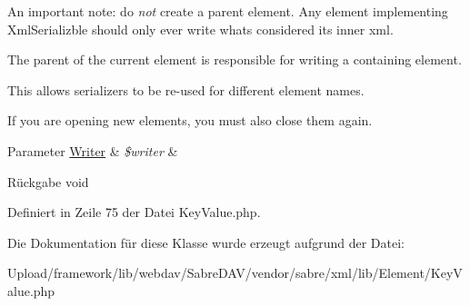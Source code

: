 An important note\+: do {\itshape not} create a parent element. Any element implementing Xml\+Serializble should only ever write what\textquotesingle{}s considered its \textquotesingle{}inner xml\textquotesingle{}.

The parent of the current element is responsible for writing a containing element.

This allows serializers to be re-\/used for different element names.

If you are opening new elements, you must also close them again.


\begin{DoxyParams}[1]{Parameter}
\mbox{\hyperlink{class_sabre_1_1_xml_1_1_writer}{Writer}} & {\em \$writer} & \\
\hline
\end{DoxyParams}
\begin{DoxyReturn}{Rückgabe}
void 
\end{DoxyReturn}


Definiert in Zeile 75 der Datei Key\+Value.\+php.



Die Dokumentation für diese Klasse wurde erzeugt aufgrund der Datei\+:\begin{DoxyCompactItemize}
\item 
Upload/framework/lib/webdav/\+Sabre\+D\+A\+V/vendor/sabre/xml/lib/\+Element/Key\+Value.\+php\end{DoxyCompactItemize}
